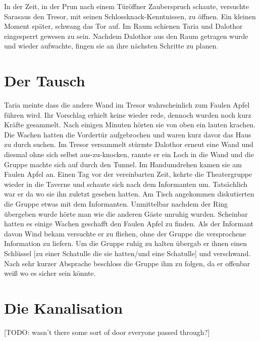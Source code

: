 \documentclass[10pt,twoside,twocolumn,openany]{book}
\begin{document}
	In der Zeit, in der Prun nach einem Türöffner Zauberspruch schaute, versuchte Sarasaus den Tresor, mit seinen Schlossknack-Kenntnissen, zu öffnen. Ein kleinen Moment später, schwang das Tor auf. Im Raum schienen Taria und Dalothor eingesperrt gewesen zu sein. Nachdem Dalothor aus den Raum getragen wurde und wieder aufwachte, fingen sie an ihre nächsten Schritte zu planen. 
	
	\section{Der Tausch}
	
	Taria meinte dass die andere Wand im Tresor wahrscheinlich zum Faulen Apfel führen wird. Ihr Vorschlag erhielt keine wieder rede, dennoch wurden noch kurz Kräfte gesammelt. Nach einigen Minuten hörten sie von oben ein lauten krachen. Die Wachen hatten die Vordertür aufgebrochen und waren kurz davor das Haus zu durch suchen. Im Tresor versammelt stürmte Dalothor erneut eine Wand und diesmal ohne sich selbst aus-zu-knocken, rannte er ein Loch in die Wand und die Gruppe machte sich auf durch den Tunnel. Im Handumdrehen kamen sie am Faulen Apfel an. Einen Tag vor der vereinbarten Zeit, kehrte die Theatergruppe wieder in die Taverne und schaute sich nach dem Informanten um. Tatsächlich war er da wo sie ihn zuletzt gesehen hatten. Am Tisch angekommen diskutierten die Gruppe etwas mit dem Informanten. Unmittelbar nachdem der Ring übergeben wurde hörte man wie die anderen Gäste unruhig wurden. Scheinbar hatten es einige Wachen geschafft den Faulen Apfel zu finden. Als der Informant davon Wind bekam versuchte er zu fliehen, ohne der Gruppe die versprochene Information zu liefern. Um die Gruppe ruhig zu halten übergab er ihnen einen Schlüssel [zu einer Schatulle die sie hatten/und eine Schatulle] und verschwand. Nach sehr kurzer Absprache beschloss die Gruppe ihm zu folgen, da er offenbar weiß wo es sicher sein könnte.
	
	\section{Die Kanalisation}
	
	[TODO: wasn't there some sort of door everyone passed through?]
	
\end{document}
